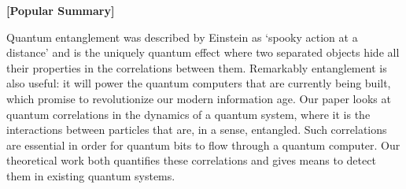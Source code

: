 \documentclass[11pt]{letter}
\newcommand{\ddd}[1]{\textcolor{Blue}{[#1]}}
\begin{document}
%
%

%
% 
% 
% 
 
\textbf{[Popular Summary]}

Quantum entanglement was described by Einstein as `spooky action at a distance' and is the uniquely quantum effect where two separated objects hide all their properties in the correlations between them. Remarkably entanglement is also useful: it will power the quantum computers that are currently being built, which promise to revolutionize our modern information age. Our paper looks at quantum correlations in the dynamics of a quantum system, where it is the interactions between particles that are, in a sense, entangled. Such correlations are essential in order for quantum bits to flow through a quantum computer. Our theoretical work both quantifies these correlations and gives means to detect them in existing quantum systems.
 
\end{document}
